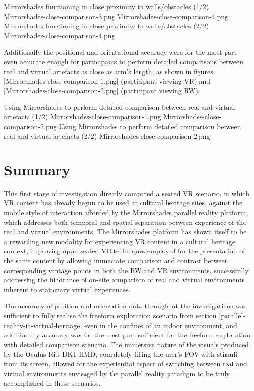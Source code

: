  {Mirrorshades functioning in close proximity to walls/obstacles (1/2).} {Mirrorshades-close-comparison-3.png}
       {Mirrorshades-close-comparison-4.png} {Mirrorshades functioning in close proximity to walls/obstacles (2/2).} {Mirrorshades-close-comparison-4.png}

Additionally the positional and orientational accuracy were for the most part even accurate enough for participants to perform detailed comparisons between real and virtual artefacts as close as arm's length, as shown in figures \ref{Mirrorshades-close-comparison-1.png} (participant viewing VR) and \ref{Mirrorshades-close-comparison-2.png} (participant viewing RW).

 {Using Mirrorshades to perform detailed comparison between real and virtual artefacts (1/2)} {Mirrorshades-close-comparison-1.png}
       {Mirrorshades-close-comparison-2.png} {Using Mirrorshades to perform detailed comparison between real and virtual artefacts (2/2)} {Mirrorshades-close-comparison-2.png}


\section{Summary}

This first stage of investigation directly compared a seated VR scenario, in which VR content has already begun to be used at cultural heritage sites, against the mobile style of interaction afforded by the Mirrorshades parallel reality platform, which addresses both temporal and spatial separation between experience of the real and virtual environments. The Mirrorshades platform has shown itself to be a rewarding new modality for experiencing VR content in a cultural heritage context, improving upon seated VR techniques employed for the presentation of the same content by allowing immediate comparison and contrast between corresponding vantage points in both the RW and VR environments, successfully addressing the hindrance of on-site comparison of real and virtual environments inherent to stationary virtual experiences.

The accuracy of position and orientation data throughout the investigations was sufficient to fully realise the freeform exploration scenario from section \ref{parallel-reality-in-virtual-heritage} even in the confines of an indoor environment, and additionally accuracy was for the most part sufficient for the freeform exploration with detailed comparison scenario. The immersive nature of the visuals produced by the Oculus Rift DK1 HMD, completely filling the user's FOV with stimuli from its screen, allowed for the experiential aspect of switching between real and virtual environments envisaged by the parallel reality paradigm to be truly accomplished in these scenarios.


